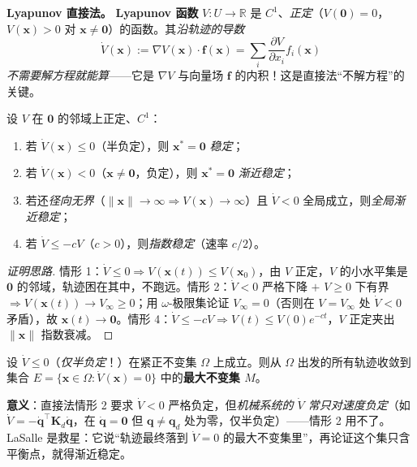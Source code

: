 \textbf{Lyapunov 直接法。} \textbf{Lyapunov 函数} $V:U\to\mathbb{R}$ 是 $C^1$、\emph{正定}（$V(\mathbf{0})=0$，$V(\mathbf{x})>0$ 对 $\mathbf{x}\neq\mathbf{0}$）的函数。其\emph{沿轨迹的导数}
\begin{equation}
  \dot V(\mathbf{x}):=\nabla V(\mathbf{x})\cdot\mathbf{f}(\mathbf{x})=\sum_i\frac{\partial V}{\partial x_i}f_i(\mathbf{x})
  \label{eq:Vdot}
\end{equation}
\emph{不需要解方程就能算}——它是 $\nabla V$ 与向量场 $\mathbf{f}$ 的内积！这是直接法“不解方程”的关键。

\begin{theorem}\label{thm:lyapunov-direct}
设 $V$ 在 $\mathbf{0}$ 的邻域上正定、$C^1$：
\begin{enumerate}
  \item 若 $\dot V(\mathbf{x})\le0$（半负定），则 $\mathbf{x}^*=\mathbf{0}$ \emph{稳定}；
  \item 若 $\dot V(\mathbf{x})<0$（$\mathbf{x}\neq\mathbf{0}$，负定），则 $\mathbf{x}^*=\mathbf{0}$ \emph{渐近稳定}；
  \item 若还\emph{径向无界}（$\|\mathbf{x}\|\to\infty\Rightarrow V(\mathbf{x})\to\infty$）且 $\dot V<0$ 全局成立，则\emph{全局渐近稳定}；
  \item 若 $\dot V\le-cV$（$c>0$），则\emph{指数稳定}（速率 $c/2$）。
\end{enumerate}
\end{theorem}
\begin{proof}[证明思路]
情形 1：$\dot V\le0\Rightarrow V(\mathbf{x}(t))\le V(\mathbf{x}_0)$，由 $V$ 正定，$V$ 的小水平集是 $\mathbf{0}$ 的邻域，轨迹困在其中，不跑远。情形 2：$\dot V<0$ 严格下降 $+$ $V\ge0$ 下有界 $\Rightarrow V(\mathbf{x}(t))\to V_\infty\ge0$；用 $\omega$-极限集论证 $V_\infty=0$（否则在 $V=V_\infty$ 处 $\dot V<0$ 矛盾），故 $\mathbf{x}(t)\to\mathbf{0}$。情形 4：$\dot V\le-cV\Rightarrow V(t)\le V(0)e^{-ct}$，$V$ 正定夹出 $\|\mathbf{x}\|$ 指数衰减。
\end{proof}

\begin{theorem}\label{thm:lasalle}
设 $\dot V\le0$（\emph{仅半负定}！）在紧正不变集 $\Omega$ 上成立。则从 $\Omega$ 出发的所有轨迹收敛到集合 $E=\{\mathbf{x}\in\Omega:\dot V(\mathbf{x})=0\}$ 中的\textbf{最大不变集 $M$}。
\end{theorem}
\noindent\textbf{意义}：直接法情形 2 要求 $\dot V<0$ 严格负定，但\emph{机械系统的 $\dot V$ 常只对速度负定}（如 $\dot V=-\dot{\mathbf{q}}^\top\mathbf{K}_d\dot{\mathbf{q}}$，在 $\dot{\mathbf{q}}=\mathbf{0}$ 但 $\mathbf{q}\neq\mathbf{q}_d$ 处为零，仅半负定）——情形 2 用不了。LaSalle 是救星：它说“轨迹最终落到 $\dot V=0$ 的最大不变集里”，再论证这个集只含平衡点，就得渐近稳定。

